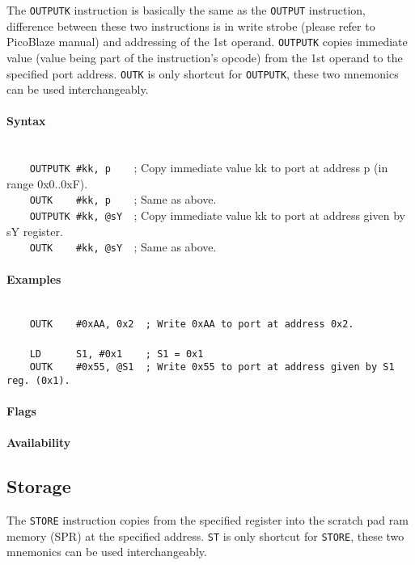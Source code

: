     \clearpage
        The \texttt{OUTPUTK} instruction is basically the same as the \texttt{OUTPUT} instruction, difference between these two instructions is in write strobe (please refer to PicoBlaze manual) and addressing of the 1st operand. \texttt{OUTPUTK} copies immediate value (value being part of the instruction's opcode) from the 1st operand to the specified port address. \texttt{OUTK} is only shortcut for \texttt{OUTPUTK}, these two mnemonics can be used interchangeably.

        \paragraph{Syntax}
            ~\\
            \verb'    OUTPUTK #kk, p    '; Copy immediate value kk to port at address p (in range 0x0..0xF).\\
            \verb'    OUTK    #kk, p    '; Same as above.\\
            \verb'    OUTPUTK #kk, @sY  '; Copy immediate value kk to port at address given by sY register.\\
            \verb'    OUTK    #kk, @sY  '; Same as above.

        \paragraph{Examples}
            ~\\
            \verb'    OUTK    #0xAA, 0x2  ; Write 0xAA to port at address 0x2.'\\
            \verb''\\
            \verb'    LD      S1, #0x1    ; S1 = 0x1'\\
            \verb'    OUTK    #0x55, @S1  ; Write 0x55 to port at address given by S1 reg. (0x1).'

        \paragraph{Flags}

        \paragraph{Availability}
            \pbavailability{\yes}{\no}{\no}{\no}{\no}

\clearpage
\subsection{Storage}
        The \texttt{STORE} instruction copies from the specified register into the scratch pad ram memory (SPR) at the specified address. \texttt{ST} is only shortcut for \texttt{STORE}, these two mnemonics can be used interchangeably.

